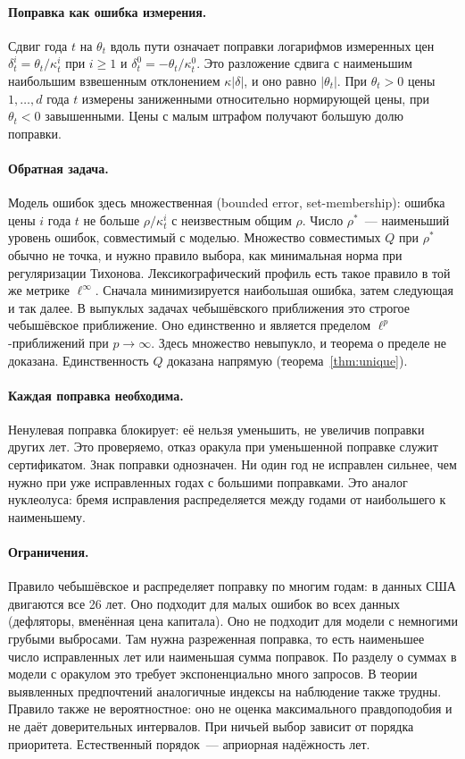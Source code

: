 \documentclass[a4paper,11pt]{article}
\theoremstyle{plain}
\theoremstyle{definition}
\theoremstyle{remark}
\newcommand{\abs}[1]{\left\lvert #1 \right\rvert}
\begin{document}
\paragraph{Поправка как ошибка измерения.} Сдвиг года $t$ на $\theta_t$ вдоль пути означает поправки логарифмов измеренных цен $\delta^i_t=\theta_t/\kappa^i_t$ при $i\ge1$ и $\delta^0_t=-\theta_t/\kappa^0_t$. Это разложение сдвига с наименьшим наибольшим взвешенным отклонением $\kappa\abs\delta$, и оно равно $\abs{\theta_t}$. При $\theta_t>0$ цены $1,\dots,d$ года $t$ измерены заниженными относительно нормирующей цены, при $\theta_t<0$ завышенными. Цены с малым штрафом получают большую долю поправки.

\paragraph{Обратная задача.} Модель ошибок здесь множественная (bounded error, set-membership): ошибка цены $i$ года $t$ не больше $\rho/\kappa^i_t$ с неизвестным общим $\rho$. Число $\rho^*$~--- наименьший уровень ошибок, совместимый с моделью. Множество совместимых $Q$ при $\rho^*$ обычно не точка, и нужно правило выбора, как минимальная норма при регуляризации Тихонова. Лексикографический профиль есть такое правило в той же метрике $\ell^\infty$. Сначала минимизируется наибольшая ошибка, затем следующая и так далее. В выпуклых задачах чебышёвского приближения это строгое чебышёвское приближение. Оно единственно и является пределом $\ell^p$-приближений при $p\to\infty$. Здесь множество невыпукло, и теорема о пределе не доказана. Единственность $Q$ доказана напрямую (теорема~\ref{thm:unique}).

\paragraph{Каждая поправка необходима.} Ненулевая поправка блокирует: её нельзя уменьшить, не увеличив поправки других лет. Это проверяемо, отказ оракула при уменьшенной поправке служит сертификатом. Знак поправки однозначен. Ни один год не исправлен сильнее, чем нужно при уже исправленных годах с большими поправками. Это аналог нуклеолуса: бремя исправления распределяется между годами от наибольшего к наименьшему.

\paragraph{Ограничения.} Правило чебышёвское и распределяет поправку по многим годам: в данных США двигаются все 26 лет. Оно подходит для малых ошибок во всех данных (дефляторы, вменённая цена капитала). Оно не подходит для модели с немногими грубыми выбросами. Там нужна разреженная поправка, то есть наименьшее число исправленных лет или наименьшая сумма поправок. По разделу о суммах в модели с оракулом это требует экспоненциально много запросов. В теории выявленных предпочтений аналогичные индексы на наблюдение также трудны. Правило также не вероятностное: оно не оценка максимального правдоподобия и не даёт доверительных интервалов. При ничьей выбор зависит от порядка приоритета. Естественный порядок~--- априорная надёжность лет.
\end{document}
